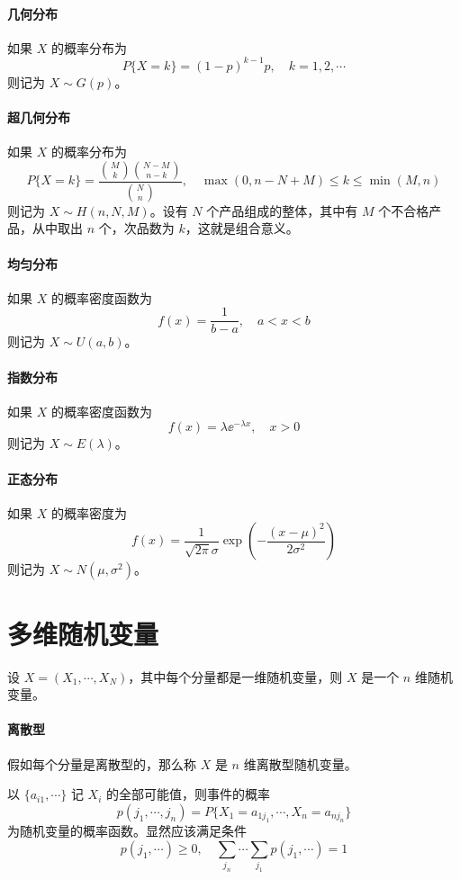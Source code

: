 \paragraph{几何分布}
如果 $X$ 的概率分布为
\[ P\{X=k\} = (1 - p)^{k-1}p, \quad k = 1, 2, \cdots \]
则记为 $X \sim G(p)$。

\paragraph{超几何分布}
如果 $X$ 的概率分布为
\[ P\{X = k\} = \frac{\binom{M}{k} \binom{N - M}{n - k}}{\binom{N}{n}}, \quad \max(0, n - N + M) \leqslant k \leqslant \min(M, n) \]
则记为 $X \sim H(n, N, M)$。设有 $N$ 个产品组成的整体，其中有 $M$ 个不合格产品，从中取出 $n$ 个，次品数为 $k$，这就是组合意义。

\paragraph{均匀分布}
如果 $X$ 的概率密度函数为
\[ f(x) = \frac{1}{b - a}, \quad a < x < b \]
则记为 $X \sim U(a, b)$。

\paragraph{指数分布}
如果 $X$ 的概率密度函数为
\[ f(x) = \lambda \ee^{-\lambda x}, \quad x > 0 \]
则记为 $X \sim E(\lambda)$。

\paragraph{正态分布}
如果 $X$ 的概率密度为
\[ f(x) = \frac{1}{\sqrt{2 \pi}  \sigma} \exp \left(- \frac{(x - \mu)^2}{2\sigma^2}  \right) \]
则记为 $X \sim N(\mu, \sigma^2)$。

\section{多维随机变量}

设 $X = (X_1, \cdots, X_N)$，其中每个分量都是一维随机变量，则 $X$ 是一个 $n$ 维随机变量。

\paragraph{离散型}

假如每个分量是离散型的，那么称 $X$ 是 $n$ 维离散型随机变量。

\begin{definition}
	以 $\{a_{i1}, \cdots\}$ 记 $X_i$ 的全部可能值，则事件的概率
	\[ p(j_1, \cdots, j_n) = P\{X_1 = a_{1j_1}, \cdots, X_n = a_{n j_n}\} \]
	为随机变量的概率函数。显然应该满足条件
	\[ p(j_1, \cdots) \geqslant 0, \quad \sum_{j_n} \cdots \sum_{j_1} p(j_1, \cdots)  =1 \]
\end{definition}


